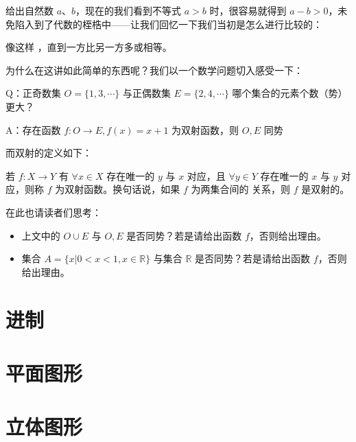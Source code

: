给出自然数 $a$、$b$，现在的我们看到不等式 $a > b$ 时，很容易就得到 $a - b > 0$，未免陷入到了代数的桎梏中——让我们回忆一下我们当初是怎么进行比较的：

\begin{center}
\end{center}

像这样 ，直到一方比另一方多或相等。

为什么在这讲如此简单的东西呢？我们以一个数学问题切入感受一下：

Q：正奇数集 $O = \{1, 3, \cdots\}$ 与正偶数集 $E = \{2, 4, \cdots\}$ 哪个集合的元素个数（势）更大？

A：存在函数 $f: O \to E, f(x) = x + 1$ 为双射函数，则 $O, E$ 同势

而双射的定义如下：

若 $f: X \to Y$ 有 $\forall x \in X$ 存在唯一的 $y$ 与 $x$ 对应，且 $\forall y \in Y$ 存在唯一的 $x$ 与 $y$ 对应，则称 $f$ 为双射函数。换句话说，如果 $f$ 为两集合间的  关系，则 $f$ 是双射的。

在此也请读者们思考：

\begin{itemize}
  \item 上文中的 $O \cup E$ 与 $O, E$ 是否同势？若是请给出函数 $f$，否则给出理由。
  \item  集合 $A = \{x | 0 < x < 1, x \in \mathbb{R}\}$ 与集合 $\mathbb{R}$ 是否同势？若是请给出函数 $f$，否则给出理由。
\end{itemize}

\section{进制}

\section{平面图形}

\section{立体图形}

